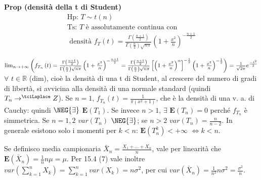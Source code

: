 \documentclass{article}
\begin{document}
\textbf{Prop (densit\`{a} della t di Student)}%
\begin{gather*}
\text{Hp: }T\sim t\left( n\right) \\
\text{Ts: }T\text{ \`{e} assolutamente continua con} \\
\text{ densit\`{a} }f_{T}\left( t\right) =\frac{\Gamma \left( \frac{n+1}{2}%
\right) }{\Gamma \left( \frac{n}{2}\right) \sqrt{n\pi }}\left( 1+\frac{x^{2}%
}{n}\right) ^{-\frac{n+1}{2}}
\end{gather*}

$\lim_{n\rightarrow +\infty }\left( f_{T_{n}}\left( t\right) =\frac{\Gamma
\left( \frac{n+1}{2}\right) }{\Gamma \left( \frac{n}{2}\right) \sqrt{n\pi }}%
\left( 1+\frac{x^{2}}{n}\right) ^{-\frac{n+1}{2}}=\frac{\Gamma \left( \frac{%
n+1}{2}\right) }{\Gamma \left( \frac{n}{2}\right) \sqrt{n\pi }}\left[ \left(
1+\frac{x^{2}}{n}\right) ^{n}\right] ^{-\frac{1}{2}}\left( 1+\frac{x^{2}}{n}%
\right) ^{-\frac{1}{2}}\right) =\frac{1}{\sqrt{2\pi }}e^{\frac{-t^{2}}{2}}$ $%
\forall $ $t\in 
\mathbb{R}
$ (dim), cio\`{e} la densit\`{a} di una t di Student, al crescere del numero
di gradi di libert\`{a}, si avvicina alla densit\`{a} di una normale
standard (quindi $T_{n}\rightarrow ^{\tciLaplace }Z$). Se $n=1$, $%
f_{T_{n}}\left( t\right) =\frac{1}{\pi \left( x^{2}+1\right) }$, che \`{e}
la densit\`{a} di una v. a. di Cauchy: quindi $\NEG{\exists}$ $\mathbf{E}%
\left( T_{1}\right) $. Se invece $n>1$, $\exists $ $\mathbf{E}\left(
T_{n}\right) =0$ perch\'{e} $f_{T_{n}}$ \`{e} simmetrica. Se $n=1,2$ $%
var\left( T_{n}\right) $ $\NEG{\exists}$; se $n>2$ $var\left( T_{n}\right) =%
\frac{n}{n-2}$. In generale esistono solo i momenti per $k<n$: $\mathbf{E}%
\left( T_{n}^{k}\right) <+\infty $ $\Longleftrightarrow k<n$.

Se definisco media campionaria $\bar{X}_{n}=\frac{X_{1}+...+X_{n}}{n}$, vale
per linearit\`{a} che $\mathbf{E}\left( \bar{X}_{n}\right) =\frac{1}{n}n\mu
=\mu $. Per 15.4 (7) vale inoltre $var\left( \sum_{k=1}^{n}X_{k}\right)
=\sum_{k=1}^{n}var\left( X_{k}\right) =n\sigma ^{2}$, per cui $var\left( 
\bar{X}_{n}\right) =\frac{1}{n^{2}}n\sigma ^{2}=\frac{\sigma ^{2}}{n}$.
\end{document}
